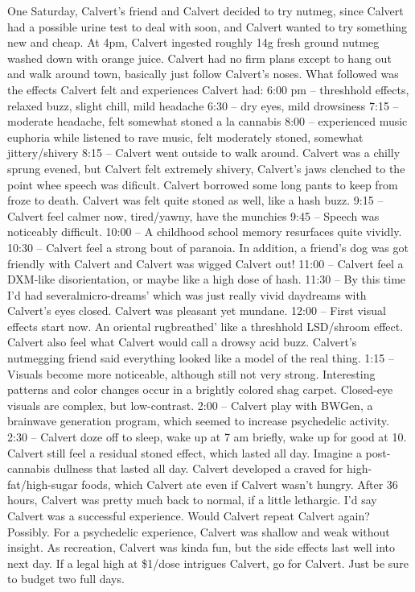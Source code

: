 \documentclass[12pt]{book}
\begin{document}
One Saturday, Calvert's friend and Calvert decided to try nutmeg, since Calvert had a possible urine test to deal with soon, and Calvert wanted to try something new and cheap. At 4pm, Calvert ingested roughly 14g fresh ground nutmeg washed down with orange juice. Calvert had no firm plans except to hang out and walk around town, basically just follow Calvert's noses. What followed was the effects Calvert felt and experiences Calvert had: 6:00 pm -- threshhold effects, relaxed buzz, slight chill, mild headache 6:30 -- dry eyes, mild drowsiness 7:15 -- moderate headache, felt somewhat stoned a la cannabis 8:00 -- experienced music euphoria while listened to rave music, felt moderately stoned, somewhat jittery/shivery 8:15 -- Calvert went outside to walk around. Calvert was a chilly sprung evened, but Calvert felt extremely shivery, Calvert's jaws clenched to the point whee speech was dificult. Calvert borrowed some long pants to keep from froze to death. Calvert was felt quite stoned as well, like a hash buzz. 9:15 -- Calvert feel calmer now, tired/yawny, have the munchies 9:45 -- Speech was noticeably difficult. 10:00 -- A childhood school memory resurfaces quite vividly. 10:30 -- Calvert feel a strong bout of paranoia. In addition, a friend's dog was got friendly with Calvert and Calvert was wigged Calvert out! 11:00 -- Calvert feel a DXM-like disorientation, or maybe like a high dose of hash. 11:30 -- By this time I'd had severalmicro-dreams' which was just really vivid daydreams with Calvert's eyes closed. Calvert was pleasant yet mundane. 12:00 -- First visual effects start now. An oriental rugbreathed' like a threshhold LSD/shroom effect. Calvert also feel what Calvert would call a drowsy acid buzz. Calvert's nutmegging friend said everything looked like a model of the real thing. 1:15 -- Visuals become more noticeable, although still not very strong. Interesting patterns and color changes occur in a brightly colored shag carpet. Closed-eye visuals are complex, but low-contrast. 2:00 -- Calvert play with BWGen, a brainwave generation program, which seemed to increase psychedelic activity. 2:30 -- Calvert doze off to sleep, wake up at 7 am briefly, wake up for good at 10. Calvert still feel a residual stoned effect, which lasted all day. Imagine a post-cannabis dullness that lasted all day. Calvert developed a craved for high-fat/high-sugar foods, which Calvert ate even if Calvert wasn't hungry. After 36 hours, Calvert was pretty much back to normal, if a little lethargic. I'd say Calvert was a successful experience. Would Calvert repeat Calvert again? Possibly. For a psychedelic experience, Calvert was shallow and weak without insight. As recreation, Calvert was kinda fun, but the side effects last well into next day. If a legal high at \$1/dose intrigues Calvert, go for Calvert. Just be sure to budget two full days.
\end{document}
